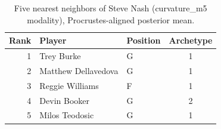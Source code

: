 \begin{table}[htbp]
  \centering\small
  \begin{tabular}{rllc}
    \toprule
    Rank & Player & Position & Archetype \\
    \midrule
    1 & Trey Burke & G & 1 \\
    2 & Matthew Dellavedova & G & 1 \\
    3 & Reggie Williams & F & 1 \\
    4 & Devin Booker & G & 2 \\
    5 & Milos Teodosic & G & 1 \\
    \bottomrule
  \end{tabular}
  \caption{Five nearest neighbors of Steve Nash (curvature_m5 modality), Procrustes-aligned posterior mean.}
  \label{tab:Steve_Nash_neighbors_curvature_m5}
\end{table}

